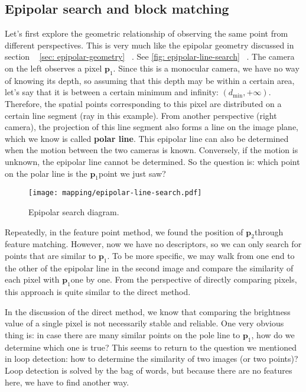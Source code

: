 \subsection{Epipolar search and block matching}

Let's first explore the geometric relationship of observing the same point from different perspectives. This is very much like the epipolar geometry discussed in section ~ \ref{sec: epipolar-geometry} ~. See \autoref{fig: epipolar-line-search} ~. The camera on the left observes a pixel $\bm{p}_1 $. Since this is a monocular camera, we have no way of knowing its depth, so assuming that this depth may be within a certain area, let's say that it is between a certain minimum and infinity: $(d_ \mathrm{min}, + \infty) $. Therefore, the spatial points corresponding to this pixel are distributed on a certain line segment (ray in this example). From another perspective (right camera), the projection of this line segment also forms a line on the image plane, which we know is called \textbf{polar line}. This epipolar line can also be determined when the motion between the two cameras is known. Conversely, if the motion is unknown, the epipolar line cannot be determined. So the question is: which point on the polar line is the $\bm{p}_1 $point we just saw?

\begin{figure}[! htp]
\centering
\texttt{[image: mapping/epipolar-line-search.pdf]}
\caption{Epipolar search diagram. }
\label{fig: epipolar-line-search}
\end{figure}

Repeatedly, in the feature point method, we found the position of $\bm{p}_2 $through feature matching. However, now we have no descriptors, so we can only search for points that are similar to $\bm{p}_1 $. To be more specific, we may walk from one end to the other of the epipolar line in the second image and compare the similarity of each pixel with $\bm{p}_1 $one by one. From the perspective of directly comparing pixels, this approach is quite similar to the direct method.

In the discussion of the direct method, we know that comparing the brightness value of a single pixel is not necessarily stable and reliable. One very obvious thing is: in case there are many similar points on the pole line to $\bm{p}_1 $, how do we determine which one is true? This seems to return to the question we mentioned in loop detection: how to determine the similarity of two images (or two points)? Loop detection is solved by the bag of words, but because there are no features here, we have to find another way.

